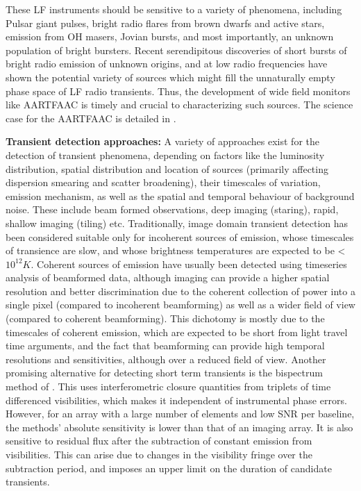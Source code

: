 \documentclass{aa}
\begin{document}
These LF  instruments should be sensitive  to a variety  of phenomena, including
Pulsar giant  pulses, bright  radio flares from  brown dwarfs and  active stars,
emission  from  OH masers,  Jovian  bursts,  and  most importantly,  an  unknown
population of bright bursters.  Recent serendipitous discoveries of short bursts
of  bright radio  emission  of unknown  origins,  and at  low radio  frequencies
\citep{lorimer2007bright,  thornton2013population}   have  shown  the  potential
variety of  sources which  might fill  the unnaturally empty  phase space  of LF
radio transients. Thus, the development  of wide field monitors like AARTFAAC is
timely  and crucial to  characterizing such  sources. The  science case  for the
AARTFAAC is detailed in \citep{wijers2013aartfaac}.

\textbf{Transient detection  approaches:} A variety  of approaches exist  for the
detection  of transient  phenomena,  depending on  factors  like the  luminosity
distribution, spatial distribution and  location of sources (primarily affecting
dispersion  smearing and  scatter  broadening), their  timescales of  variation,
emission mechanism, as well as  the spatial and temporal behaviour of background
noise.  These  include beam formed observations, deep  imaging (staring), rapid,
shallow imaging  (tiling) etc.  Traditionally, image  domain transient detection
has  been considered  suitable only  for incoherent  sources of  emission, whose
timescales  of  transience  are  slow,  and whose  brightness  temperatures  are
expected  to be  <$10^{12}K$.  Coherent  sources of  emission have  usually been
detected  using timeseries  analysis of  beamformed data,  although  imaging can
provide  a  higher spatial  resolution  and  better  discrimination due  to  the
coherent  collection  of power  into  a  single  pixel (compared  to  incoherent
beamforming)  as  well   as  a  wider  field  of   view  (compared  to  coherent
beamforming).   This dichotomy  is  mostly  due to  the  timescales of  coherent
emission, which are  expected to be short from light  travel time arguments, and
the   fact  that  beamforming   can  provide   high  temporal   resolutions  and
sensitivities,  although  over  a  reduced  field of  view.   Another  promising
alternative  for detecting  short term  transients is  the bispectrum  method of
\citep{law2012all}.  This uses  interferometric closure quantities from triplets
of  time differenced visibilities,  which makes  it independent  of instrumental
phase errors.  However, for an array with a large number of elements and low SNR
per baseline, the methods' absolute sensitivity is lower than that of an imaging
array.  It is also sensitive to  residual flux after the subtraction of constant
emission from  visibilities.  This  can arise due  to changes in  the visibility
fringe over the  subtraction period, and imposes an upper  limit on the duration
of candidate transients.
\end{document}
